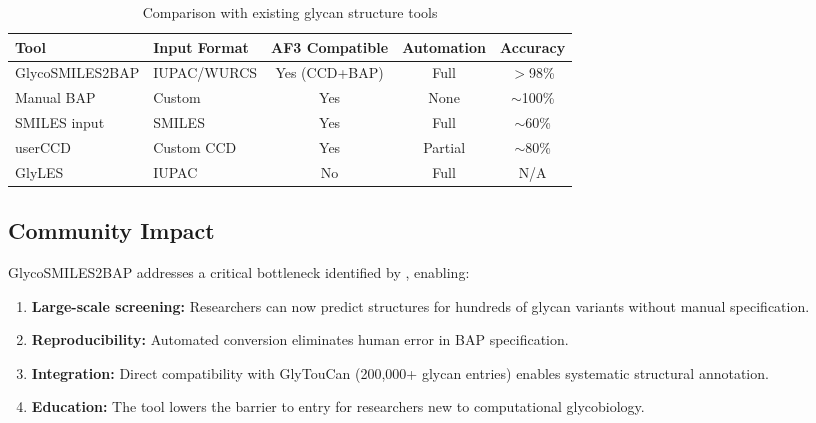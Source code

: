 \begin{table}[h]
\centering
\caption{Comparison with existing glycan structure tools}
\label{tab:comparison}
\begin{tabular}{llccc}
\toprule
Tool & Input Format & AF3 Compatible & Automation & Accuracy \\
\midrule
GlycoSMILES2BAP & IUPAC/WURCS & Yes (CCD+BAP) & Full & $>$98\% \\
Manual BAP & Custom & Yes & None & $\sim$100\% \\
SMILES input & SMILES & Yes & Full & $\sim$60\% \\
userCCD & Custom CCD & Yes & Partial & $\sim$80\% \\
GlyLES & IUPAC & No & Full & N/A \\
\bottomrule
\end{tabular}
\end{table}

\subsection{Community Impact}

GlycoSMILES2BAP addresses a critical bottleneck identified by \citet{huang2025}, enabling:

\begin{enumerate}
\item \textbf{Large-scale screening:} Researchers can now predict structures for hundreds of glycan variants without manual specification.

\item \textbf{Reproducibility:} Automated conversion eliminates human error in BAP specification.

\item \textbf{Integration:} Direct compatibility with GlyTouCan (200,000+ glycan entries) enables systematic structural annotation.

\item \textbf{Education:} The tool lowers the barrier to entry for researchers new to computational glycobiology.
\end{enumerate}
